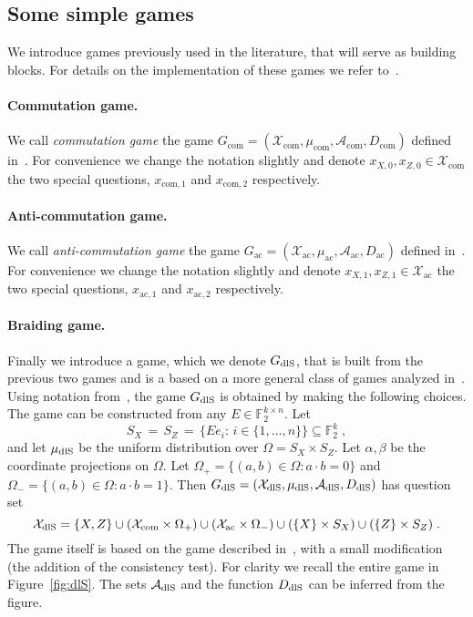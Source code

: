 \documentclass[11pt]{article}
\theoremstyle{definition}
\newcommand{\field}{\mathbb{F}_2}
\newcommand{\dlS}{\ensuremath{\rm dlS}}
\newcommand{\F}{\ensuremath{\mathbb{F}}}
\newcommand{\mA}{\ensuremath{\mathcal{A}}}
\newcommand{\mX}{\ensuremath{\mathcal{X}}}
\newcommand{\cc}{\mathrm{com}}
\newcommand{\ac}{\mathrm{ac}}
\begin{document}
\subsection{Some simple games}

We introduce games previously used in the literature, that will serve as building blocks. For details on the implementation of these games we refer to~\cite{de2022spectral}.

\paragraph{Commutation game.}
We call \emph{commutation game} the game $G_{\cc}=(\mX_\cc,\mu_\cc,\mA_\cc,D_\cc)$ defined in~\cite[Section 3.1]{de2022spectral}. For convenience we change the notation slightly and denote $x_{X,0}, x_{Z,0} \in \mX_{\cc}$ the two special questions, $x_{\cc,1}$ and $x_{\cc,2}$ respectively. 

\paragraph{Anti-commutation game.}
We call \emph{anti-commutation game} the game $G_\ac=(\mX_\ac,\mu_\ac,\mA_\ac,D_\ac)$ defined in~\cite[Section 3.2]{de2022spectral}. For convenience we change the notation slightly and  denote $x_{X,1}, x_{Z,1} \in \mX_{\ac}$ the two special questions, $x_{\ac,1}$ and $x_{\ac,2}$ respectively. 

\paragraph{Braiding game.}
Finally we introduce a game, which we denote $G_{\dlS}$, that is built from the previous two games and is a based on a more general class of games analyzed in~\cite[Section 3.4]{de2022spectral}.  Using notation from~\cite{de2022spectral}, the game $G_{\dlS}$ is obtained by making the following choices. The game can be constructed from any $E\in\F_2^{k\times n}$. Let 
\begin{equation}\label{eq:dls-sets}
 S_X\,=\,S_Z\,=\,\{E e_i:\,i\in\{1,\ldots,n\}\}\subseteq \field^k\;,
\end{equation}
and let $\mu_{\dlS}$ be the uniform distribution over $\Omega=S_X\times S_Z$. Let $\alpha,\beta$ be the coordinate projections on $\Omega$. Let $\Omega_+ = \{(a,b)\in \Omega:a\cdot b=0\}$ and $\Omega_-=\{(a,b)\in\Omega:a\cdot b=1\}$. Then $G_{\dlS}=(\mX_{\dlS},\mu_{\dlS},\mA_{\dlS},D_{\dlS})$ has question set 
\[ \mX_{\dlS} = \{X,Z\} \cup (\mX_{\cc}\times \Omega_+) \cup (\mX_{\ac} \times \Omega_-) \cup (\{X\}\times S_X) \cup (\{Z\}\times S_Z)\;.\]
The game itself is based on the game described in~\cite[Section 3.4]{de2022spectral}, with a small modification (the addition of the consistency test). For clarity we recall the entire game in Figure~\ref{fig:dlS}. The sets $\mA_{\dlS}$ and the function $D_{\dlS}$ can be inferred from the figure. 
\end{document}
